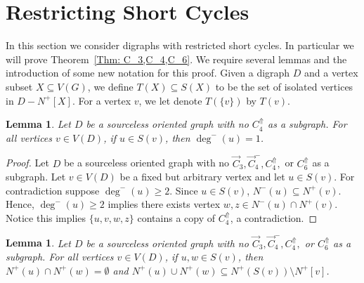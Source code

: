 \documentclass[12pt]{article}
\newtheorem{lemma}[theorem]{Lemma}
\theoremstyle{definition}
\begin{document}
\section{Restricting Short Cycles}

In this section we consider
digraphs with restricted short cycles.
In particular we will prove Theorem~\ref{Thm: C_3,C_4,C_6}.
We require several lemmas and the introduction of some new notation for this proof.
Given a digraph $D$ and a vertex subset $X \subseteq V(G)$, we define $T(X) \subseteq S(X)$ to be the set of isolated vertices in $D-N^+[X]$.
For a vertex $v$, we let denote $T(\{v\})$ by $T(v)$.

\begin{lemma}\label{Lemma: no short-cycle S-struct}
    Let $D$ be a sourceless oriented graph with no $C_4^{\Uparrow}$ as a subgraph.
    For all vertices $v \in V(D)$, if $u \in S(v)$, then $\deg^-(u) = 1$.
\end{lemma}

\begin{proof}
    Let $D$ be a sourceless oriented graph with no $\Vec{C}_3, \Vec{C}^{-}_4,C_4^{\Uparrow},$ or $C_6^{\Uparrow}$ as a subgraph.
    Let $v \in V(D)$ be a fixed but arbitrary vertex and let $u \in S(v)$.
    For contradiction suppose $\deg^-(u)\geq 2$.
    Since $u \in S(v)$, $N^-(u) \subseteq N^+(v)$.
    Hence, $\deg^-(u)\geq 2$ implies there exists vertex $w,z \in N^-(u)\cap N^+(v)$.
    Notice this implies $\{u,v,w,z\}$ contains a copy of $C_4^{\Uparrow}$, a contradiction.
\end{proof}


\begin{lemma}\label{Lemma: no short-cycle S-neighbourhoods}
    Let $D$ be a sourceless oriented graph with no $\Vec{C}_3, \Vec{C}^{-}_4,C_4^{\Uparrow},$ or $C_6^{\Uparrow}$ as a subgraph.
    For all vertices $v \in V(D)$, if $u,w \in S(v)$, then $N^+(u)\cap N^+(w) = \emptyset$ and $N^+(u)\cup N^+(w) \subseteq N^+(S(v))\setminus N^+[v]$.
\end{lemma}
\end{document}
